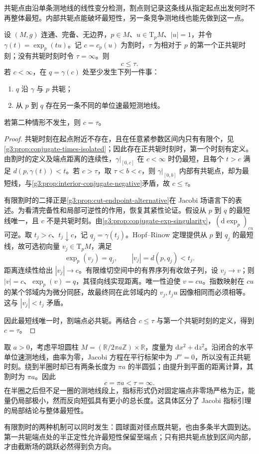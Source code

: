 共轭点由沿单条测地线的线性变分检测，割点则记录这条线从指定起点出发何时不再整体最短。内部共轭点能破坏最短性，另一条竞争测地线也能先做到这一点。

\begin{theorem}\label{g3:thm:cut-point-alternative}
	设 \((M,g)\) 连通、完备、无边界，\(p\in M\)、\(u\in\mathrm T_pM\)、\(|u|=1\)，并令 \(\gamma(t)=\exp_p(tu)\)。记 \(c=c_p(u)\) 为割时，\(\tau\) 为相对于 \(p\) 的第一个正共轭时刻；没有共轭时刻时令 \(\tau=\infty\)。则
	\[
		c\le\tau.
	\]
	若 \(c<\infty\)，在 \(q=\gamma(c)\) 处至少发生下列一件事：
	\begin{enumerate}
		\item \(q\) 沿 \(\gamma\) 与 \(p\) 共轭；
		\item 从 \(p\) 到 \(q\) 存在另一条不同的单位速最短测地线。
	\end{enumerate}
	若第二种情形不发生，则 \(c=\tau\)。
\end{theorem}
\begin{proof}
	共轭时刻在起点附近不存在，且在任意紧参数区间内只有有限个，见\cref{g3:prop:conjugate-times-isolated}；因此存在正共轭时刻时，第一个时刻有定义。由割时的定义及端点距离的连续性，\(\gamma|_{[0,c]}\) 在 \(c<\infty\) 时仍最短，且每个 \(t>c\) 满足 \(d(p,\gamma(t))<t\)。若 \(c>\tau\)，取 \(\tau<b<c\)，则 \(\gamma|_{[0,b]}\) 内部有共轭点，却为最短线，与\cref{g3:prop:interior-conjugate-negative}矛盾，故 \(c\le\tau\)。

	有限割时的二择正是\cref{g3:prop:cut-endpoint-alternative}在 Jacobi 场语言下的表述。为看清完备性和局部可逆性的作用，恢复其紧性论证。假设从 \(p\) 到 \(q\) 的最短线唯一，且 \(c\) 不是共轭时刻。由\cref{g3:prop:conjugate-exp-singularity}，\((\mathrm d\exp_p)_{cu}\) 可逆。取 \(t_j>c\)、\(t_j\downarrow c\)，记 \(q_j=\gamma(t_j)\)。Hopf--Rinow 定理提供从 \(p\) 到 \(q_j\) 的最短线，故可选初向量 \(v_j\in\mathrm T_pM\)，满足
	\[
		\exp_p(v_j)=q_j,\qquad |v_j|=d(p,q_j)<t_j.
	\]
	距离连续性给出 \(|v_j|\to c\)。有限维切空间中的有界序列有收敛子列，设 \(v_j\to v\)；则 \(|v|=c\)、\(\exp_p(v)=q\)，其径向线实现距离。唯一性迫使 \(v=cu\)。指数映射在 \(cu\) 的某个邻域内为微分同胚，故最终同在此邻域内的 \(v_j,t_ju\) 因像相同而必须相等。这与 \(|v_j|<t_j\) 矛盾。

	因此最短线唯一时，割端点必共轭。再结合 \(c\le\tau\) 与第一个共轭时刻的定义，得到 \(c=\tau\)。
\end{proof}

\begin{example}\label{g3:exm:cylinder-cut-before-conjugate}
	取 \(a>0\)，考虑平坦圆柱 \(M=(\mathbb R/2\pi a\mathbb Z)\times\mathbb R\)，度量为 \(\mathrm dx^2+\mathrm dz^2\)。沿闭合的水平单位速测地线，曲率为零，Jacobi 方程在平行标架中为 \(J''=0\)，所以没有正共轭时刻。绕到半圈时却已有两条长度为 \(\pi a\) 的半圆弧；由提升到平面的距离计算，其割时为 \(\pi a\)。因此
	\[
		c=\pi a<\tau=\infty.
	\]
	在半圈之后但不足一圈的测地线段上，指标形式仍对固定端点非零场严格为正，能量仍局部极小，然而反向短弧具有更小的总长度。这具体区分了 Jacobi 指标引理的局部结论与整体最短性。
\end{example}

有限割时的两种机制可以同时发生：圆球面对径点既共轭，也由多条半大圆到达。第一共轭端点处的半正定性允许最短性保留至端点；只有把共轭点放到区间内部，才由截断场的跳跃必然得到负方向。
